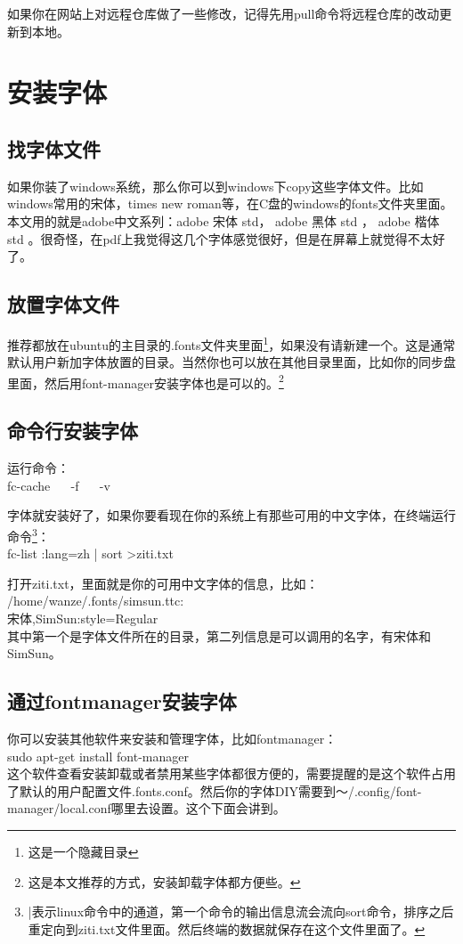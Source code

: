 如果你在网站上对远程仓库做了一些修改，记得先用pull命令将远程仓库的改动更新到本地。


\section{安装字体}
\label{sec:安装字体} 
\subsection{找字体文件}
如果你装了windows系统，那么你可以到windows下copy这些字体文件。比如windows常用的宋体，times new roman等，在C盘的windows的fonts文件夹里面。本文用的就是adobe中文系列：adobe 宋体 std， adobe 黑体 std ， adobe 楷体 std 。很奇怪，在pdf上我觉得这几个字体感觉很好，但是在屏幕上就觉得不太好了。

\subsection{放置字体文件}
推荐都放在ubuntu的主目录的.fonts文件夹里面\footnote{这是一个隐藏目录}，如果没有请新建一个。这是通常默认用户新加字体放置的目录。当然你也可以放在其他目录里面，比如你的同步盘里面，然后用font-manager安装字体也是可以的。\footnote{这是本文推荐的方式，安装卸载字体都方便些。}

\subsection{命令行安装字体}
运行命令：\\
fc-cache ~~ -f ~~ -v  

字体就安装好了，如果你要看现在你的系统上有那些可用的中文字体，在终端运行命令\footnote{|表示linux命令中的通道，第一个命令的输出信息流会流向sort命令，排序之后重定向到ziti.txt文件里面。然后终端的数据就保存在这个文件里面了。}：\\
fc-list :lang=zh | sort >ziti.txt 

打开ziti.txt，里面就是你的可用中文字体的信息，比如：\\
/home/wanze/.fonts/simsun.ttc: \\宋体,SimSun:style=Regular \\
其中第一个是字体文件所在的目录，第二列信息是可以调用的名字，有宋体和SimSun。

\subsection{通过fontmanager安装字体}
你可以安装其他软件来安装和管理字体，比如fontmanager：\\
sudo  apt-get install font-manager  \\
这个软件查看安装卸载或者禁用某些字体都很方便的，需要提醒的是这个软件占用了默认的用户配置文件.fonts.conf。然后你的字体DIY需要到～/.config/font-manager/local.conf哪里去设置。这个下面会讲到。

